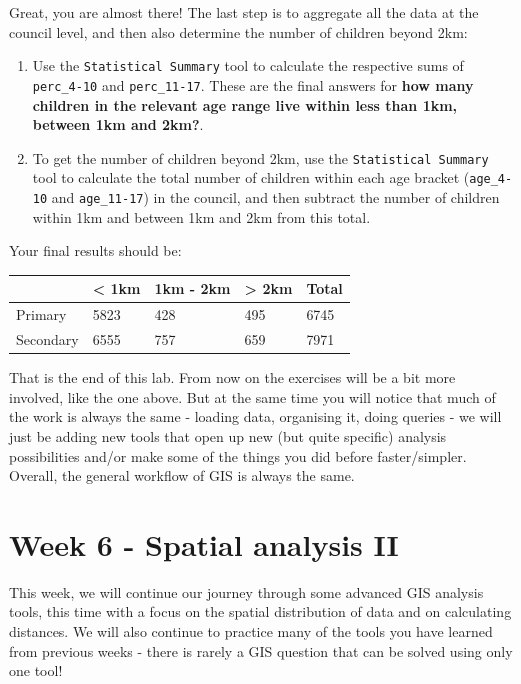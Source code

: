 \documentclass[
  letterpaper,
  DIV=11,
  numbers=noendperiod]{scrreprt}
\begin{document}
Great, you are almost there! The last step is to aggregate all the data
at the council level, and then also determine the number of children
beyond 2km:

\begin{enumerate}
\def\labelenumi{(\arabic{enumi})}
\setcounter{enumi}{304}
\item
  Use the \texttt{Statistical\ Summary} tool to calculate the respective
  sums of \texttt{perc\_4-10} and \texttt{perc\_11-17}. These are the
  final answers for \textbf{how many children in the relevant age range
  live within less than 1km, between 1km and 2km?}.
\item
  To get the number of children beyond 2km, use the
  \texttt{Statistical\ Summary} tool to calculate the total number of
  children within each age bracket (\texttt{age\_4-10} and
  \texttt{age\_11-17}) in the council, and then subtract the number of
  children within 1km and between 1km and 2km from this total.
\end{enumerate}

Your final results should be:

\begin{longtable}[]{@{}lllll@{}}
\toprule\noalign{}
& \textless{} 1km & 1km - 2km & \textgreater{} 2km & Total \\
\midrule\noalign{}
\endhead
\bottomrule\noalign{}
\endlastfoot
Primary & 5823 & 428 & 495 & 6745 \\
Secondary & 6555 & 757 & 659 & 7971 \\
\end{longtable}

That is the end of this lab. From now on the exercises will be a bit
more involved, like the one above. But at the same time you will notice
that much of the work is always the same - loading data, organising it,
doing queries - we will just be adding new tools that open up new (but
quite specific) analysis possibilities and/or make some of the things
you did before faster/simpler. Overall, the general workflow of GIS is
always the same.

\part{Week 6 - Spatial analysis II}

This week, we will continue our journey through some advanced GIS
analysis tools, this time with a focus on the spatial distribution of
data and on calculating distances. We will also continue to practice
many of the tools you have learned from previous weeks - there is rarely
a GIS question that can be solved using only one tool!
\end{document}
